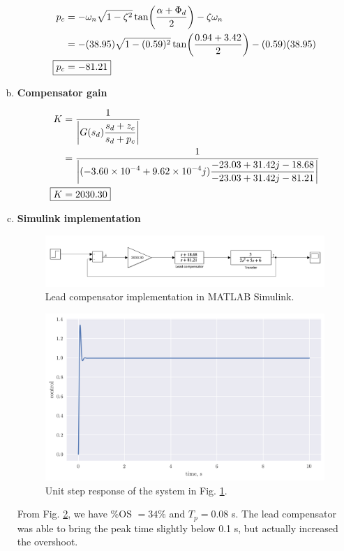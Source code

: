 \documentclass[12pt,a4paper]{article}
\newcommand\ddfrac[2]{\frac{\displaystyle #1}{\displaystyle #2}}
\begin{document}
\begin{enumerate}[a)]
\begin{align}
	p_c &= -\omega_n \sqrt{1 - \zeta^2} \tan(\frac{\alpha + \Phi_d}{2}) - \zeta\omega_n \\
	&= -(38.95)\sqrt{1 - (0.59)^2} \tan(\frac{0.94 + 3.42}{2}) - (0.59)(38.95) \\
	\Aboxed{
		p_c &= -81.21
	} \label{eq:pc}
\end{align}

\item \textbf{Compensator gain}

\begin{align}
	K &= \ddfrac{1}{\abs{G(s_d)\frac{s_d + z_c}{s_d + p_c}}} \\
	&= \ddfrac{1}{\abs{(-3.60 \times 10^{-4} + 9.62 \times 10^{-4} j) \frac{-23.03 + 31.42j - 18.68}{-23.03 + 31.42j - 81.21}}} \\
	\Aboxed{
	K &= 2030.30
	} \label{eq:gain}
\end{align}

\item \textbf{Simulink implementation}

\begin{figure}[h!]
	\centering
	\includegraphics[width=\linewidth]{lc_simulink.png}
	\caption{Lead compensator implementation in MATLAB Simulink.}
	\label{fig:lc-simulink}
\end{figure}

\begin{figure}[h!]
	\centering
	\includegraphics[width=0.9\linewidth]{LE3_lc_step.png}
	\caption{Unit step response of the system in Fig. \ref{fig:lc-simulink}.}
	\label{fig:lc-step}
\end{figure}

From Fig. \ref{fig:lc-step}, we have \%OS $= 34\%$ and $T_p = 0.08$ s. The lead compensator was able to bring the peak time slightly below 0.1 s, but actually increased the overshoot.

\end{enumerate}
\end{document}
